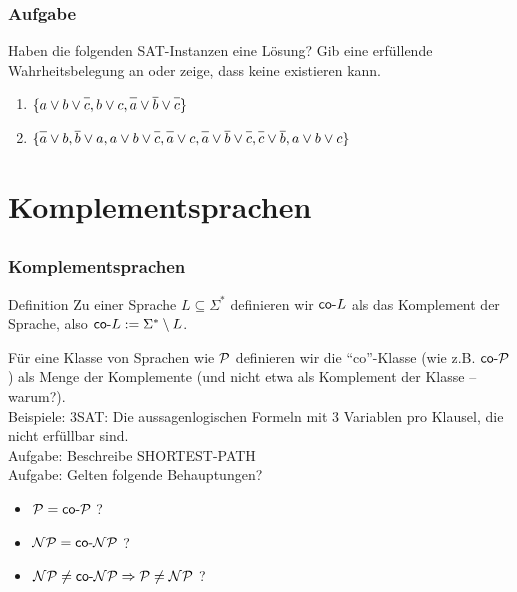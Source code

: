 \begin{frame}
	\frametitle{Aufgabe}
	
	Haben die folgenden SAT-Instanzen eine Lösung? Gib eine erfüllende Wahrheitsbelegung an oder zeige, dass keine existieren kann.
\begin{enumerate}
 \item $\{a \vee b \vee \neglit{c}, b \vee c, \neglit{a} \vee \neglit{b} \vee \neglit{c}\}$
 \item $\{\neglit{a} \vee b, \neglit{b} \vee  a, a \vee b \vee \neglit{c}, \neglit{a} \vee c, \neglit{a} \vee \neglit{b} \vee \neglit{c}, \neglit{c} \vee \neglit{b}, a \vee b \vee c\}$
\end{enumerate}
\end{frame}

\section{Komplementsprachen}
\subsection{}

\begin{frame}
\frametitle{Komplementsprachen}
\begin{block}{Definition}
Zu einer Sprache $L \subseteq \Sigma^*$ definieren wir $\mathsf{co\text{-}} L$ als das Komplement der Sprache, also
$\mathsf{co\text{-}} L := \Sigma^*\setminus L$.
\end{block}
Für eine Klasse von Sprachen wie $\mathcal{P}$ definieren wir die "`co"'-Klasse (wie z.B. $\mathsf{co\text{-}}\mathcal{P}$) als Menge der Komplemente (und nicht etwa als Komplement der Klasse -- warum?).\\[8pt]
\pause
Beispiele: \co 3SAT: Die aussagenlogischen Formeln mit 3 Variablen pro Klausel, die nicht erfüllbar sind.\\[8pt]

\pause
Aufgabe: Beschreibe \co SHORTEST-PATH\\[8pt]

\pause
Aufgabe: Gelten folgende Behauptungen?
\begin{itemize}
    \item $\mathcal{P} = \mathsf{co\text{-}}\mathcal{P}$ ?
    \item $\mathcal{NP} = \mathsf{co\text{-}}\mathcal{NP}$ ?
    \invincible \pause
    \item $\mathcal{NP} \neq \mathsf{co\text{-}}\mathcal{NP} \Rightarrow \mathcal{P} \neq \mathcal{NP}$ ?
    \vincible
\end{itemize}
\end{frame}

